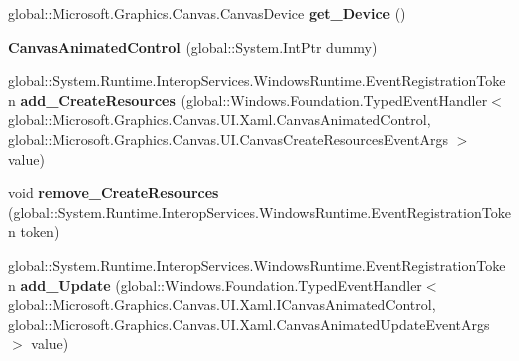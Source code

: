 \begin{DoxyCompactItemize}
global\+::\+Microsoft.\+Graphics.\+Canvas.\+Canvas\+Device {\bfseries get\+\_\+\+Device} ()
\item 
\mbox{\label{class_microsoft_1_1_graphics_1_1_canvas_1_1_u_i_1_1_xaml_1_1_canvas_animated_control_a8981d0bd18a97c22dbdf7422dc124959}} 
{\bfseries Canvas\+Animated\+Control} (global\+::\+System.\+Int\+Ptr dummy)
\item 
\mbox{\label{class_microsoft_1_1_graphics_1_1_canvas_1_1_u_i_1_1_xaml_1_1_canvas_animated_control_a625047d0ad176bc76c1686e025f4ee53}} 
global\+::\+System.\+Runtime.\+Interop\+Services.\+Windows\+Runtime.\+Event\+Registration\+Token {\bfseries add\+\_\+\+Create\+Resources} (global\+::\+Windows.\+Foundation.\+Typed\+Event\+Handler$<$ global\+::\+Microsoft.\+Graphics.\+Canvas.\+U\+I.\+Xaml.\+Canvas\+Animated\+Control, global\+::\+Microsoft.\+Graphics.\+Canvas.\+U\+I.\+Canvas\+Create\+Resources\+Event\+Args $>$ value)
\item 
\mbox{\label{class_microsoft_1_1_graphics_1_1_canvas_1_1_u_i_1_1_xaml_1_1_canvas_animated_control_a44a43d134b2c41ea2ec6eddf26aadd31}} 
void {\bfseries remove\+\_\+\+Create\+Resources} (global\+::\+System.\+Runtime.\+Interop\+Services.\+Windows\+Runtime.\+Event\+Registration\+Token token)
\item 
\mbox{\label{class_microsoft_1_1_graphics_1_1_canvas_1_1_u_i_1_1_xaml_1_1_canvas_animated_control_aa7a0e408eb82cfc307935e5bb671c4b8}} 
global\+::\+System.\+Runtime.\+Interop\+Services.\+Windows\+Runtime.\+Event\+Registration\+Token {\bfseries add\+\_\+\+Update} (global\+::\+Windows.\+Foundation.\+Typed\+Event\+Handler$<$ global\+::\+Microsoft.\+Graphics.\+Canvas.\+U\+I.\+Xaml.\+I\+Canvas\+Animated\+Control, global\+::\+Microsoft.\+Graphics.\+Canvas.\+U\+I.\+Xaml.\+Canvas\+Animated\+Update\+Event\+Args $>$ value)
\item 
\mbox{\label{class_microsoft_1_1_graphics_1_1_canvas_1_1_u_i_1_1_xaml_1_1_canvas_animated_control_a16a7c17d34f9282e536a02fcb511bb4e}} 

\end{DoxyCompactItemize}
